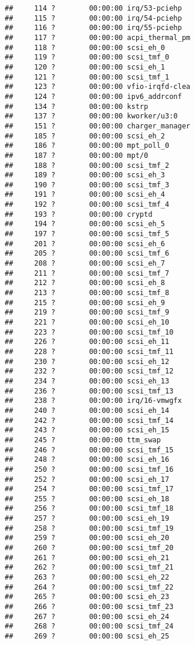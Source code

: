 \documentclass[]{article}
\begin{document}
\begin{verbatim}
##     114 ?        00:00:00 irq/53-pciehp
##     115 ?        00:00:00 irq/54-pciehp
##     116 ?        00:00:00 irq/55-pciehp
##     117 ?        00:00:00 acpi_thermal_pm
##     118 ?        00:00:00 scsi_eh_0
##     119 ?        00:00:00 scsi_tmf_0
##     120 ?        00:00:00 scsi_eh_1
##     121 ?        00:00:00 scsi_tmf_1
##     123 ?        00:00:00 vfio-irqfd-clea
##     124 ?        00:00:00 ipv6_addrconf
##     134 ?        00:00:00 kstrp
##     137 ?        00:00:00 kworker/u3:0
##     151 ?        00:00:00 charger_manager
##     185 ?        00:00:00 scsi_eh_2
##     186 ?        00:00:00 mpt_poll_0
##     187 ?        00:00:00 mpt/0
##     188 ?        00:00:00 scsi_tmf_2
##     189 ?        00:00:00 scsi_eh_3
##     190 ?        00:00:00 scsi_tmf_3
##     191 ?        00:00:00 scsi_eh_4
##     192 ?        00:00:00 scsi_tmf_4
##     193 ?        00:00:00 cryptd
##     194 ?        00:00:00 scsi_eh_5
##     197 ?        00:00:00 scsi_tmf_5
##     201 ?        00:00:00 scsi_eh_6
##     205 ?        00:00:00 scsi_tmf_6
##     208 ?        00:00:00 scsi_eh_7
##     211 ?        00:00:00 scsi_tmf_7
##     212 ?        00:00:00 scsi_eh_8
##     213 ?        00:00:00 scsi_tmf_8
##     215 ?        00:00:00 scsi_eh_9
##     219 ?        00:00:00 scsi_tmf_9
##     221 ?        00:00:00 scsi_eh_10
##     223 ?        00:00:00 scsi_tmf_10
##     226 ?        00:00:00 scsi_eh_11
##     228 ?        00:00:00 scsi_tmf_11
##     230 ?        00:00:00 scsi_eh_12
##     232 ?        00:00:00 scsi_tmf_12
##     234 ?        00:00:00 scsi_eh_13
##     236 ?        00:00:00 scsi_tmf_13
##     238 ?        00:00:00 irq/16-vmwgfx
##     240 ?        00:00:00 scsi_eh_14
##     242 ?        00:00:00 scsi_tmf_14
##     243 ?        00:00:00 scsi_eh_15
##     245 ?        00:00:00 ttm_swap
##     246 ?        00:00:00 scsi_tmf_15
##     248 ?        00:00:00 scsi_eh_16
##     250 ?        00:00:00 scsi_tmf_16
##     252 ?        00:00:00 scsi_eh_17
##     254 ?        00:00:00 scsi_tmf_17
##     255 ?        00:00:00 scsi_eh_18
##     256 ?        00:00:00 scsi_tmf_18
##     257 ?        00:00:00 scsi_eh_19
##     258 ?        00:00:00 scsi_tmf_19
##     259 ?        00:00:00 scsi_eh_20
##     260 ?        00:00:00 scsi_tmf_20
##     261 ?        00:00:00 scsi_eh_21
##     262 ?        00:00:00 scsi_tmf_21
##     263 ?        00:00:00 scsi_eh_22
##     264 ?        00:00:00 scsi_tmf_22
##     265 ?        00:00:00 scsi_eh_23
##     266 ?        00:00:00 scsi_tmf_23
##     267 ?        00:00:00 scsi_eh_24
##     268 ?        00:00:00 scsi_tmf_24
##     269 ?        00:00:00 scsi_eh_25

\end{verbatim}
\end{document}
